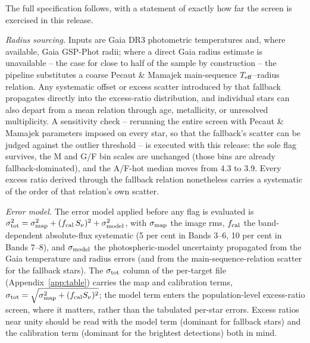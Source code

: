 \documentclass{openjournal}
\begin{document}
The full specification follows, with a statement of exactly how far
the screen is exercised in this release.

\emph{Radius sourcing.} Inputs are Gaia DR3 photometric temperatures
and, where available, Gaia GSP-Phot radii; where a direct Gaia radius
estimate is unavailable -- the case for close to half of the sample by
construction -- the pipeline substitutes a coarse Pecaut \& Mamajek
main-sequence $T_{\rm eff}$--radius relation. Any systematic offset or
excess scatter introduced by that fallback propagates directly into the
excess-ratio distribution, and individual stars can also depart from a
mean relation through age, metallicity, or unresolved multiplicity.
A sensitivity check -- rerunning the entire screen with Pecaut \&
Mamajek parameters imposed on every star, so that the fallback's
scatter can be judged against the outlier threshold -- is executed
with this release: the sole flag survives, the M and G/F bin scales
are unchanged (those bins are already fallback-dominated), and the
A/F-hot median moves from 4.3 to 3.9. Every
excess ratio derived through the fallback relation nonetheless carries
a systematic of the order of that relation's own scatter.

\emph{Error model.} The error model applied before any flag is
evaluated is
$\sigma_{\rm tot}^{2} = \sigma_{\rm map}^{2} +
(f_{\rm cal}\,S_\nu)^{2} + \sigma_{\rm model}^{2}$, with
$\sigma_{\rm map}$ the image rms, $f_{\rm cal}$ the band-dependent
absolute-flux systematic (5 per cent in Bands 3--6, 10 per cent in
Bands 7--8), and $\sigma_{\rm model}$ the photospheric-model
uncertainty propagated from the Gaia temperature and radius errors
(and from the main-sequence-relation scatter for the fallback stars).
The $\sigma_{\rm tot}$ column of the per-target file (Appendix~\ref{app:table}) carries the map
and calibration terms,
$\sigma_{\rm tot} = \sqrt{\sigma_{\rm map}^{2} + (f_{\rm cal} S_\nu)^{2}}$;
the model term enters the population-level excess-ratio screen, where
it matters, rather than the tabulated per-star errors. Excess ratios
near unity should be read with the model term (dominant for fallback
stars) and the calibration term (dominant for the brightest detections)
both in mind.
\end{document}
